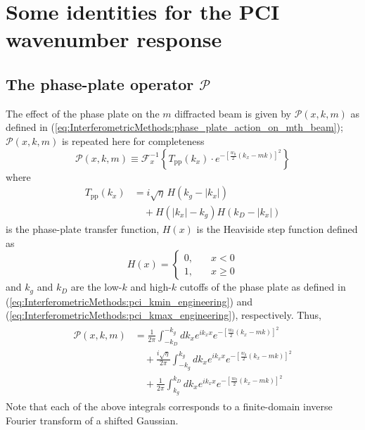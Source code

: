 \chapter{Some identities for the PCI wavenumber response}
\label{app:PCIResponseIdentities}


\section{The phase-plate operator $\mathcal{P}$}
The effect of the phase plate on the $m$ diffracted beam is given by
$\mathcal{P}(x, k, m)$ as defined in
(\ref{eq:InterferometricMethods:phase_plate_action_on_mth_beam});
$\mathcal{P}(x, k, m)$ is repeated here for completeness
\begin{equation}
  \mathcal{P}(x, k, m)
  \equiv
  \mathcal{F}_x^{-1}
  \left\{
    T_{\text{pp}}(k_x)
    \cdot
    e^{-\left[ \frac{w_0}{2} \left( k_x - m k \right) \right]^2}
  \right\}
  \label{eq:PCIResponseIdentities:phase_plate_action_on_mth_beam}
\end{equation}
where
\begin{equation}
  \begin{aligned}
    T_{\text{pp}}(k_x)
    &=
    i \sqrt{\eta} \, H(k_g - |k_x|)
    \\
    &\quad +
    H(|k_x| - k_g)
    H(k_D - |k_x|)
  \end{aligned}
  \label{eq:PCIResponseIdentities:phase_plate_transfer_function}
\end{equation}
is the phase-plate transfer function,
$H(x)$ is the Heaviside step function defined as
\begin{equation}
  H(x)
  =
  \begin{cases}
    0, \quad &x < 0 \\
    1, \quad &x \geq 0
  \end{cases}
  \label{eq:PCIResponseIdentities:Heaviside_step_function}
\end{equation}
and $k_g$ and $k_D$ are the low-$k$ and high-$k$ cutoffs of the phase plate
as defined in
(\ref{eq:InterferometricMethods:pci_kmin_engineering}) and
(\ref{eq:InterferometricMethods:pci_kmax_engineering}), respectively.
Thus,
\begin{align}
  \begin{aligned}
    \mathcal{P}(x, k, m)
    &=
    \frac{1}{2 \pi}
    \int_{-k_D}^{-k_g}
    dk_x
    e^{i k_x x}
    e^{-\left[ \frac{w_0}{2} \left( k_x - m k \right) \right]^2}
    \\
    &\quad +
    \frac{i \sqrt{\eta}}{2 \pi}
    \int_{-k_g}^{k_g}
    dk_x
    e^{i k_x x}
    e^{-\left[ \frac{w_0}{2} \left( k_x - m k \right) \right]^2}
    \\
    &\quad +
    \frac{1}{2 \pi}
    \int_{k_g}^{k_D}
    dk_x
    e^{i k_x x}
    e^{-\left[ \frac{w_0}{2} \left( k_x - m k \right) \right]^2}
  \end{aligned}
  \label{eq:PCIResponseIdentities:phase_plate_action_on_mth_beam_integrals}
\end{align}
Note that each of the above integrals
corresponds to a finite-domain inverse Fourier transform
of a shifted Gaussian.


